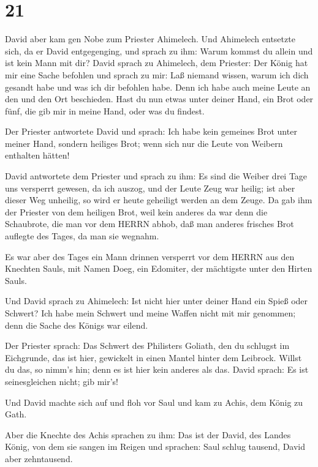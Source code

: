 \hypertarget{section-20}{%
\section{21}\label{section-20}}

 David aber kam gen Nobe zum Priester Ahimelech. Und
Ahimelech entsetzte sich, da er David entgegenging, und sprach zu ihm:
Warum kommst du allein und ist kein Mann mit dir?  David
sprach zu Ahimelech, dem Priester: Der König hat mir eine Sache befohlen
und sprach zu mir: Laß niemand wissen, warum ich dich gesandt habe und
was ich dir befohlen habe. Denn ich habe auch meine Leute an den und den
Ort beschieden.  Hast du nun etwas unter deiner Hand, ein
Brot oder fünf, die gib mir in meine Hand, oder was du findest.

 Der Priester antwortete David und sprach: Ich habe kein
gemeines Brot unter meiner Hand, sondern heiliges Brot; wenn sich nur
die Leute von Weibern enthalten hätten!

 David antwortete dem Priester und sprach zu ihm: Es sind
die Weiber drei Tage uns versperrt gewesen, da ich auszog, und der Leute
Zeug war heilig; ist aber dieser Weg unheilig, so wird er heute
geheiligt werden an dem Zeuge.  Da gab ihm der Priester von
dem heiligen Brot, weil kein anderes da war denn die Schaubrote, die man
vor dem HERRN abhob, daß man anderes frisches Brot auflegte des Tages,
da man sie wegnahm.

 Es war aber des Tages ein Mann drinnen versperrt vor dem
HERRN aus den Knechten Sauls, mit Namen Doeg, ein Edomiter, der
mächtigste unter den Hirten Sauls.

 Und David sprach zu Ahimelech: Ist nicht hier unter deiner
Hand ein Spieß oder Schwert? Ich habe mein Schwert und meine Waffen
nicht mit mir genommen; denn die Sache des Königs war eilend.

 Der Priester sprach: Das Schwert des Philisters Goliath,
den du schlugst im Eichgrunde, das ist hier, gewickelt in einen Mantel
hinter dem Leibrock. Willst du das, so nimm's hin; denn es ist hier kein
anderes als das. David sprach: Es ist seinesgleichen nicht; gib mir's!

 Und David machte sich auf und floh vor Saul und kam zu
Achis, dem König zu Gath.

 Aber die Knechte des Achis sprachen zu ihm: Das ist der
David, des Landes König, von dem sie sangen im Reigen und sprachen: Saul
schlug tausend, David aber zehntausend.


